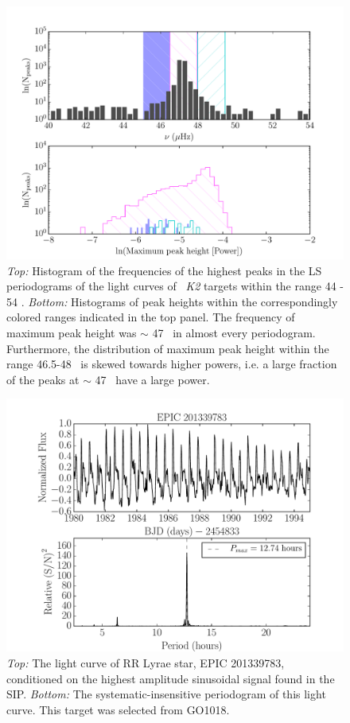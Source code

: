 \documentclass[useAMS, usenatbib, preprint, 12pt]{aastex}
\begin{document}
\begin{figure}
\begin{center}
\includegraphics[width=6in, clip=true]{vbg_hist.pdf}
\caption{{\it Top:} Histogram of the frequencies of the highest peaks in the
	LS periodograms of the \citet{Vanderburg2014} light curves of \nGO\
	{\it K2} targets within the range 44 - 54 \uHz.
	{\it Bottom:} Histograms of peak heights within the correspondingly
	colored ranges indicated in the top panel.
	The frequency of maximum peak height was $\sim$ 47 \uHz\ in almost
	every periodogram.
	Furthermore, the distribution of maximum peak height within the range
	46.5-48 \uHz\ is skewed towards higher powers, i.e. a large fraction of
	the peaks at $\sim$ 47 \uHz\ have a large power.
}
\label{fig:vbg_hist}
\end{center}
\end{figure}

\begin{figure}
\begin{center}
\includegraphics[width=6in, clip=true]{RR_201339783.pdf}
\caption{{\it Top:} The light curve of RR Lyrae star, EPIC 201339783,
	conditioned on the highest amplitude sinusoidal signal found in the
	SIP. {\it Bottom:} The systematic-insensitive periodogram of
	this light curve. This target was selected from GO1018.}
\label{fig:RRLyrae}
\end{center}
\end{figure}
\end{document}
